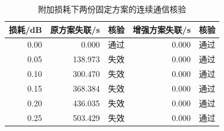 \begin{table}[htbp]\centering\small
\caption{附加损耗下两份固定方案的连续通信核验}\label{tab:q3_loss}
\begin{tabular}{@{}rrcrc@{}}
\toprule
损耗/dB & 原方案失联/s & 核验 & 增强方案失联/s & 核验\\
\midrule
0.00 & 0.000 & 通过 & 0.000 & 通过\\
0.05 & 138.973 & 失效 & 0.000 & 通过\\
0.10 & 300.470 & 失效 & 0.000 & 通过\\
0.15 & 368.384 & 失效 & 0.000 & 通过\\
0.20 & 436.035 & 失效 & 0.000 & 通过\\
0.25 & 503.429 & 失效 & 0.000 & 通过\\
\bottomrule
\end{tabular}
\end{table}
